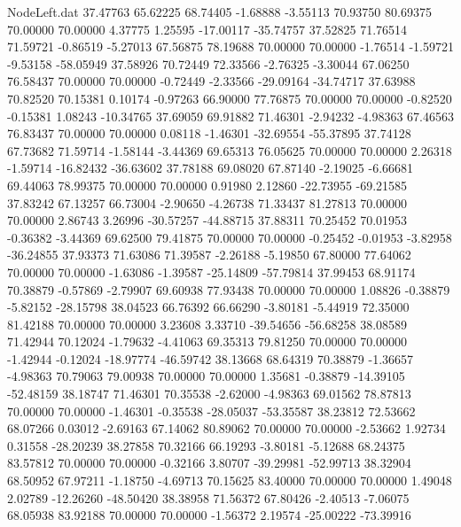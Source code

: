 \begin{filecontents}{NodeLeft.dat}
  37.47763   65.62225   68.74405    -1.68888   -3.55113   70.93750   80.69375   70.00000   70.00000    4.37775    1.25595  -17.00117  -35.74757
  37.52825   71.76514   71.59721    -0.86519   -5.27013   67.56875   78.19688   70.00000   70.00000   -1.76514   -1.59721   -9.53158  -58.05949
  37.58926   70.72449   72.33566    -2.76325   -3.30044   67.06250   76.58437   70.00000   70.00000   -0.72449   -2.33566  -29.09164  -34.74717
  37.63988   70.82520   70.15381     0.10174   -0.97263   66.90000   77.76875   70.00000   70.00000   -0.82520   -0.15381    1.08243  -10.34765
  37.69059   69.91882   71.46301    -2.94232   -4.98363   67.46563   76.83437   70.00000   70.00000    0.08118   -1.46301  -32.69554  -55.37895
  37.74128   67.73682   71.59714    -1.58144   -3.44369   69.65313   76.05625   70.00000   70.00000    2.26318   -1.59714  -16.82432  -36.63602
  37.78188   69.08020   67.87140    -2.19025   -6.66681   69.44063   78.99375   70.00000   70.00000    0.91980    2.12860  -22.73955  -69.21585
  37.83242   67.13257   66.73004    -2.90650   -4.26738   71.33437   81.27813   70.00000   70.00000    2.86743    3.26996  -30.57257  -44.88715
  37.88311   70.25452   70.01953    -0.36382   -3.44369   69.62500   79.41875   70.00000   70.00000   -0.25452   -0.01953   -3.82958  -36.24855
  37.93373   71.63086   71.39587    -2.26188   -5.19850   67.80000   77.64062   70.00000   70.00000   -1.63086   -1.39587  -25.14809  -57.79814
  37.99453   68.91174   70.38879    -0.57869   -2.79907   69.60938   77.93438   70.00000   70.00000    1.08826   -0.38879   -5.82152  -28.15798
  38.04523   66.76392   66.66290    -3.80181   -5.44919   72.35000   81.42188   70.00000   70.00000    3.23608    3.33710  -39.54656  -56.68258
  38.08589   71.42944   70.12024    -1.79632   -4.41063   69.35313   79.81250   70.00000   70.00000   -1.42944   -0.12024  -18.97774  -46.59742
  38.13668   68.64319   70.38879    -1.36657   -4.98363   70.79063   79.00938   70.00000   70.00000    1.35681   -0.38879  -14.39105  -52.48159
  38.18747   71.46301   70.35538    -2.62000   -4.98363   69.01562   78.87813   70.00000   70.00000   -1.46301   -0.35538  -28.05037  -53.35587
  38.23812   72.53662   68.07266     0.03012   -2.69163   67.14062   80.89062   70.00000   70.00000   -2.53662    1.92734    0.31558  -28.20239
  38.27858   70.32166   66.19293    -3.80181   -5.12688   68.24375   83.57812   70.00000   70.00000   -0.32166    3.80707  -39.29981  -52.99713
  38.32904   68.50952   67.97211    -1.18750   -4.69713   70.15625   83.40000   70.00000   70.00000    1.49048    2.02789  -12.26260  -48.50420
  38.38958   71.56372   67.80426    -2.40513   -7.06075   68.05938   83.92188   70.00000   70.00000   -1.56372    2.19574  -25.00222  -73.39916

\end{filecontents}
